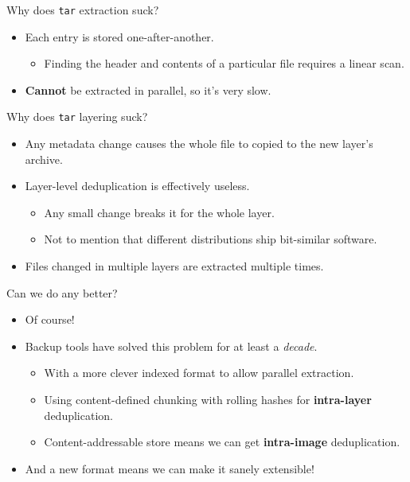 \documentclass[10pt,aspectratio=169]{beamer}
\begin{document}
	\begin{frame}{Why does \texttt{tar} extraction suck?}
		\begin{itemize}
			\item Each entry is stored one-after-another.
			\begin{itemize}
				\item Finding the header and contents of a particular file requires a linear scan.
			\end{itemize}
			\item \textbf{Cannot} be extracted in parallel, so it's very slow.
		\end{itemize}
	\end{frame}

	\begin{frame}{Why does \texttt{tar} layering suck?}
		\begin{itemize}
			\item Any metadata change causes the whole file to copied to the new layer's archive.
			\item Layer-level deduplication is effectively useless.
			\begin{itemize}
				\item Any small change breaks it for the whole layer.
				\item Not to mention that different distributions ship bit-similar software.
			\end{itemize}
			\item Files changed in multiple layers are extracted multiple times.
		\end{itemize}
	\end{frame}

	\begin{frame}{Can we do any better?}
		\begin{itemize}
			\item Of course!
			\item Backup tools have solved this problem for at least a \textit{decade}.
			\begin{itemize}
				\item With a more clever indexed format to allow parallel extraction.
				\item Using content-defined chunking with rolling hashes for \textbf{intra-layer} deduplication.
				\item Content-addressable store means we can get \textbf{intra-image} deduplication.
			\end{itemize}
			\item And a new format means we can make it sanely extensible!
		\end{itemize}
	\end{frame}
\end{document}
